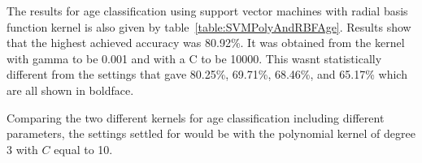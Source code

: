 \documentclass[a4paper]{llncs}
\begin{document}
The results for age classification using support vector machines with radial basis function kernel is also given by table~\ref{table:SVMPolyAndRBFAge}. Results show that the highest achieved accuracy was 80.92\%. It was obtained from the kernel with gamma to be 0.001 and with a C to be 10000. This wasnt statistically different from the settings that gave 80.25\%, 69.71\%, 68.46\%, and 65.17\% which are all shown in boldface. 

Comparing the two different kernels for age classification including different parameters, the settings settled for would be with the polynomial kernel of degree 3 with $C$ equal to 10.


\end{document}

